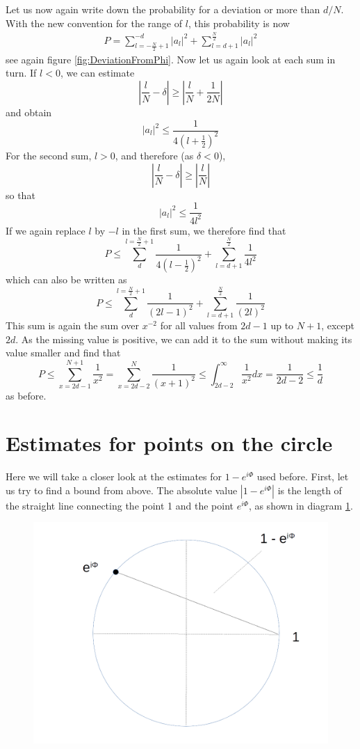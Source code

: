 \documentclass[a4paper, draft]{article}
\theoremstyle{own}
\theoremstyle{remark}
\begin{document}
Let us now again write down the probability for a deviation or more than  $d / N$. With the new convention for the range of $l$, this probability is now
\begin{align}\label{eq:probII}
P =  \sum_{l = - \frac{N}{2} + 1}^{-d} |a_l|^2 
+ 
\sum_{l=d+1}^{\frac{N}{2}} |a_l|^2
\end{align}
see again figure \ref{fig:DeviationFromPhi}. Now let us again look at each sum in turn. If $l < 0$, we can estimate
$$
|\frac{l}{N} - \delta | \geq | \frac{l}{N} + \frac{1}{2N} |
$$
and obtain
$$
|a_l|^2 \leq \frac{1}{4(l+\frac{1}{2})^2}
$$
For the second sum, $l > 0$, and therefore (as $\delta < 0$), 
$$
|\frac{l}{N} - \delta | \geq | \frac{l}{N}|
$$
so that
$$
|a_l|^2 \leq \frac{1}{4l^2}
$$
If we again replace $l$ by $-l$ in the first sum, we therefore find that
$$
P \leq  \sum_d^{l =  \frac{N}{2} + 1}  \frac{1}{4(l-\frac{1}{2})^2}
+ 
\sum_{l=d+1}^{\frac{N}{2}} \frac{1}{4l^2}
$$
which can also be written as
$$
P \leq  \sum_d^{l =  \frac{N}{2} + 1}  \frac{1}{(2l-1)^2}
+ 
\sum_{l=d+1}^{\frac{N}{2}} \frac{1}{(2l)^2}
$$
This sum is again the sum over $x^{-2}$ for all values from $2d-1$ up to $N+1$, except $2d$. As the missing value is positive, we can add it to the sum without making its value smaller and find that
$$
P \leq \sum_{x=2d-1}^{N+1} \frac{1}{x^2} = \sum_{x=2d-2}^{N} \frac{1}{(x+1)^2} \leq \int_{2d-2}^\infty \frac{1}{x^2} dx = \frac{1}{2d-2} \leq \frac{1}{d}
$$
as before.



	
\section{Estimates for points on the circle}\label{app:estimates}

Here we will take a closer look at the estimates for $1 - e^{i\Phi}$ used before. First, let us try to find a bound from above. The absolute value $| 1 - e^{i\Phi}|$ is the length of the straight line connecting the point 1 and the point $e^{i\Phi}$, as shown in diagram \ref{fig:LineSegments}.

\begin{figure}[ht]
\centering
\includegraphics[width=1.0\linewidth]{images/LineSegments}
\caption[Estimates on the unit circle]{}
\label{fig:LineSegments}
\end{figure}
\end{document}
